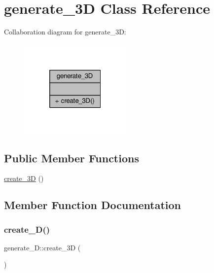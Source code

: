 \hypertarget{classgenerate__3D}{}\section{generate\+\_\+3D Class Reference}
\label{classgenerate__3D}


Collaboration diagram for generate\+\_\+3D\+:
\nopagebreak
\begin{figure}[H]
\begin{center}
\leavevmode
\includegraphics[width=157pt]{classgenerate__3D__coll__graph}
\end{center}
\end{figure}
\subsection*{Public Member Functions}
\begin{DoxyCompactItemize}
\item 
\hyperlink{classgenerate__3D_acd71c91967bb90a72123fd505dcea493}{create\+\_\+3D} ()
\end{DoxyCompactItemize}


\subsection{Member Function Documentation}
\mbox{\label{classgenerate__3D_acd71c91967bb90a72123fd505dcea493}} 
\subsubsection{\texorpdfstring{create\+\_\+D()}{create\_3D()}}
{\footnotesize\ttfamily generate\+\_\+D\+::create\+\_\+3D (\begin{DoxyParamCaption}{ }\end{DoxyParamCaption})\hspace{0.3cm}{\ttfamily [inline]}}

